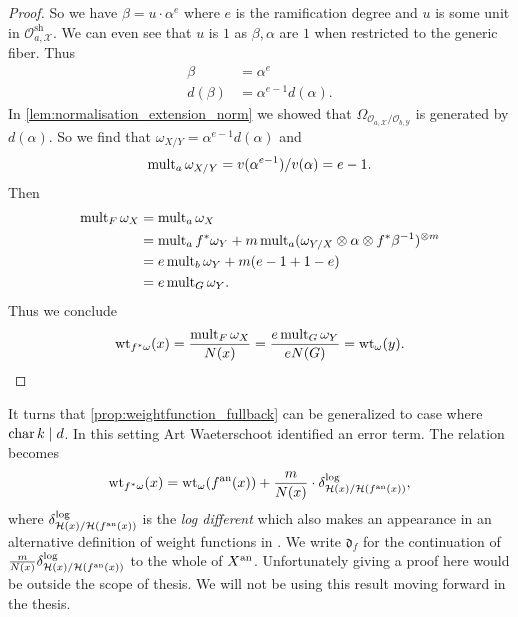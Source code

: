 \begin{proof}
	So we have $\beta = u\cdot \alpha ^{e}$ where $e$ is the ramification degree and $u$ is some unit in $\mathcal{O}_{a, \mathscr X}^{\text{sh}}$.
	We can even see that $u$ is $1$ as $\beta, \alpha$ are $1$ when restricted to the generic fiber. 
	Thus
	\begin{align*}
		\beta &= \alpha^e \\
		d(\beta) &=  \alpha^{e-1} d(\alpha)
	.\end{align*}
	In \cref{lem:normalisation_extension_norm} we showed that $\Omega_{\mathcal{O}_{a, \mathscr X} / \mathcal{O}_{b, \mathscr Y}}$ is generated by $d(\alpha)$. 
	So we find that $\omega_{X / Y} =  \alpha ^{e-1} d(\alpha)$ and \[
		\operatorname{mult}_{a} \omega_{X / Y} = v( \alpha ^{e-1}) / v(\alpha) = e-1
	.\] 
	Then  
	\begin{align*}
		\operatorname{mult}_{F} \omega_X &= \operatorname{mult}_{a} \omega _X\\
				   &=  \operatorname{mult}_{a} f^*\omega_Y +  m \operatorname{mult}_{a} (\omega_{Y / X} \otimes \alpha \otimes f^*\beta ^{-1})^{\otimes m} \\
				   &= e \operatorname{mult}_b \omega_Y + m(e-1 + 1 -e) \\
				   &= e\operatorname{mult}_{G}\omega_Y 
	.\end{align*} 
	Thus we conclude 
	 \[
		 \operatorname{wt}_{f^* \omega}(x) = \frac{\operatorname{mult}_{F} \omega_X}{N(x)} = \frac{e\operatorname{mult}_G \omega_Y}{eN(G)} = \operatorname{wt}_{\omega}(y)
	.\] 
\end{proof}

\begin{remark}\label{rem:weightfunction_fullback_art} 
	It turns that \cref{prop:weightfunction_fullback} can be generalized to case where $\operatorname{char} k \mid d$. 
	In this setting Art Waeterschoot identified an error term. 
	The relation becomes \[
		\operatorname{wt}_{f^* \omega}(x) = \operatorname{wt}_{\omega}(f{}^{\text{an}} (x)) + \frac{m}{N(x)} \cdot \delta_{\mathcal{H} (x) / \mathcal{H} (f{}^{\text{an}}(x))}^{\text{log}}
	,\] 
	where $\delta_{\mathcal{H} (x) / \mathcal{H} (f{}^{\text{an}}(x))}^{\text{log}}$ is the \emph{log different} which also makes an appearance in an alternative definition of weight functions in \cite{temkinMetrizationDifferentialPluriforms2016a}.
	We write $\mathfrak{d}_f $ for the continuation of $\frac{m}{N(x)} \delta_{\mathcal{H} (x) / \mathcal{H} (f{}^{\text{an}}(x))}^{\text{log}}$ to the whole of $X{}^{\text{an}}$. 
	Unfortunately giving a proof here would be outside the scope of thesis.
	We will not be using this result moving forward in the thesis. 
\end{remark}



